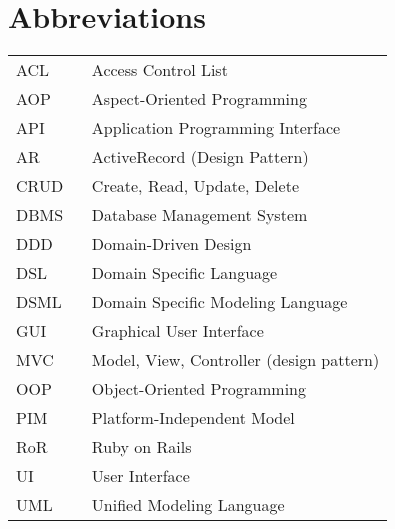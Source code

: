 \chapter*{Abbreviations}

\begin{flushleft}
\begin{tabular}{l p{0.8\linewidth}}
ACL       & Access Control List\\
AOP       & Aspect-Oriented Programming\\
API       & Application Programming Interface\\
AR        & ActiveRecord (Design Pattern)\\
CRUD      & Create, Read, Update, Delete\\
DBMS      & Database Management System\\
DDD       & Domain-Driven Design\\
DSL       & Domain Specific Language\\
DSML      & Domain Specific Modeling Language\\
GUI       & Graphical User Interface\\
MVC       & Model, View, Controller (design pattern)\\
OOP       & Object-Oriented Programming\\
PIM       & Platform-Independent Model\\
RoR       & Ruby on Rails\\
UI        & User Interface\\
UML       & Unified Modeling Language\\
\end{tabular}
\end{flushleft}
